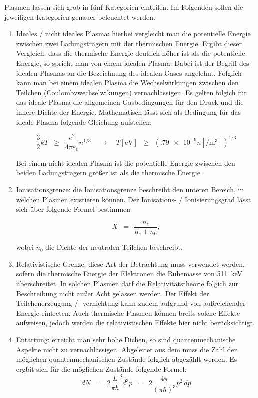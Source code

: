 \documentclass{article}
\newcommand{\widespace}{\enspace}
\newcommand{\wideeq}{\widespace = \widespace}
\newcommand{\widege}{\widespace \ge \widespace}
\begin{document}
Plasmen lassen sich grob in fünf Kategorien einteilen. Im Folgenden sollen die jeweiligen Kategorien genauer beleuchtet werden.
\begin{enumerate}
    \item Ideales / nicht ideales Plasma: hierbei vergleicht man die potentielle Energie zwischen zwei Ladungsträgern mit der thermischen Energie. Ergibt dieser Vergleich, dass die thermische Energie deutlich höher ist als die potentielle Energie, so spricht man von einem idealen Plasma. Dabei ist der Begriff des idealen Plasmas an die Bezeichnung des idealen Gases angelehnt. Folglich kann man bei einem idealen Plasma die Wechselwirkungen zwischen den Teilchen (Coulombvwechselwikungen) vernachlässigen. Es gelten folgich für das ideale Plasma die allgemeinen Gasbedingungen für den Druck und die innere Dichte der Energie. Mathematisch lässt sich als Bedingung für das ideale Plasma folgende Gleichung aufstellen:
    
   \[
       \frac{3}{2} kT \widege \frac{e^2}{4\pi\varepsilon_{0}} n^{1 / 3}
       \quad \to \quad T[\unit{\eV}] \widege
       \left( \num{.79e-9} n [\unit{\per\cubic\meter}] \right)^{1 / 3}
   \]

   Bei einem nicht idealen Plasma ist die potentielle Energie zwischen den beiden Ladungsträgern größer ist als die thermische Energie.

   \item Ionisationsgrenze: die Ionisationsgrenze beschreibt den unteren Bereich, in welchen Plasmen existieren können. Der Ionisations- / Ionisierungsgrad lässt sich über folgende Formel bestimmen

   \[   
       X \wideeq \frac{n_{e}}{n_{e}+n_{0}},
   \]

    wobei $n_{0}$ die Dichte der neutralen Teilchen beschreibt. 

    \item Relativistische Grenze: diese Art der Betrachtung muss verwendet werden, sofern die thermische Energie der Elektronen die Ruhemasse von \qty{511}{\keV} überschreitet. In solchen Plasmen darf die Relativitätstheorie folgich zur Beschreibung nicht außer Acht gelassen werden. Der Effekt der Teilchenerzeugung / -vernichtung kann zudem aufgrund von außreichender Energie eintreten. Auch thermische Plasmen können breits solche Effekte aufweisen, jedoch werden die relativistischen Effekte hier nicht berücksichtigt.

    \item Entartung: erreicht man sehr hohe Dichen, so sind quantenmechanische Aspekte nicht zu vernachlässigen. Abgeleitet aus dem  muss die Zahl der möglichen quantenmechanischen Zustände folglich abgezählt werden. Es ergbit sich für die möglichen Zustände folgende Formel: 
    \[
        dN \wideeq 2\frac{L}{\pi\hbar}^3 d^3p
        \wideeq 2 \frac{4\pi}{(\pi\hbar)^3} p^2 \, dp
    \]


\end{enumerate}
\end{document}
